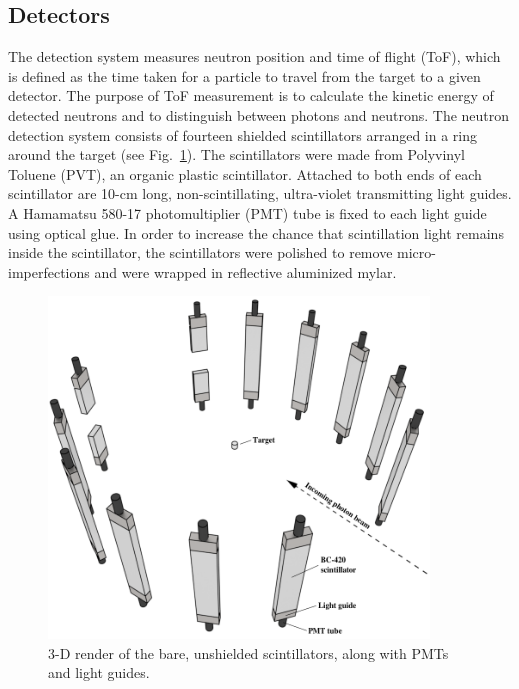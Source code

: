 \subsection{Detectors}
\label{subsection:detectors}
The detection system measures neutron position and time of flight (ToF), which is defined as the time taken for a particle to travel from the target to a given detector.
The purpose of ToF measurement is to calculate the kinetic energy of detected neutrons and to distinguish between photons and neutrons.
The neutron detection system consists of fourteen shielded scintillators arranged in a ring around the target (see Fig.~\ref{fig:DetGeom}).
The scintillators were made from Polyvinyl Toluene (PVT), an organic plastic scintillator.
Attached to both ends of each scintillator are 10-cm long, non-scintillating, ultra-violet transmitting light guides.
A Hamamatsu 580-17 photomultiplier (PMT) tube is fixed to each light guide using optical glue.
In order to increase the chance that scintillation light remains inside the scintillator, the scintillators were polished to remove micro-imperfections and were wrapped in reflective aluminized mylar.
\begin{figure}[]
    \centering
    \includegraphics[width = 0.9\textwidth]{Content/Methods/Detectors.png}
    \caption{3-D render of the bare, unshielded scintillators, along with PMTs and light guides.}
    \label{fig:DetGeom}
\end{figure}

